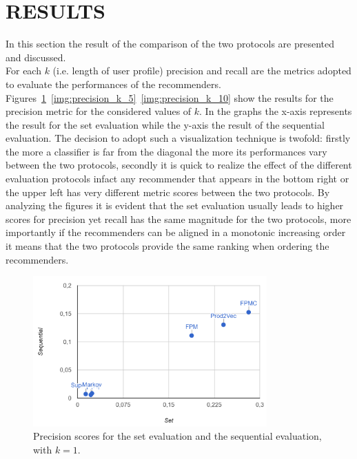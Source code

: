 \documentclass[prodmode,acmtecs]{acmsmall} %
\begin{document}
\section{RESULTS}
In this section the result of the comparison of the two protocols are presented and discussed.\\
For each $k$ (i.e. length of user profile) precision and recall are the metrics adopted to evaluate the performances of the recommenders.  
Figures~\ref{img:precision_k_1}~\ref{img:precision_k_5}~\ref{img:precision_k_10} show the results for the precision metric for the considered values of $k$. In the graphs the x-axis represents the result for the set evaluation while the y-axis the result of the sequential evaluation. The decision to adopt such a visualization technique is twofold: firstly the more a classifier is far from the diagonal the more its performances vary between the two protocols, secondly it is quick to realize the effect of the different evaluation protocols infact any recommender that appears in the bottom right or the upper left has very different metric scores between the two protocols. By analyzing the figures it is evident that the set evaluation usually leads to higher scores for precision yet recall has the same magnitude for the two protocols, more importantly if the recommenders can be aligned in  a monotonic increasing order it means that the two protocols provide the same ranking when ordering the recommenders.
\begin{figure}[H]
	\centering			
	\includegraphics[width=0.8\textwidth]{img/precision_k_1.png}
	\caption{Precision scores for the set evaluation and the sequential evaluation, with $k=1$.}
	\label{img:precision_k_1}
\end{figure}
\end{document}
